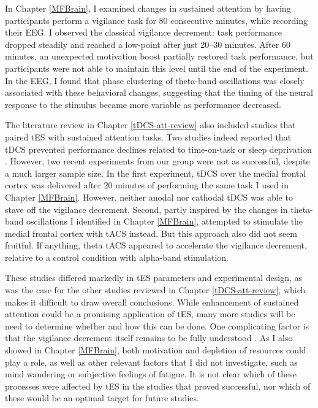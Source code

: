 \documentclass[11pt,]{memoir}
\begin{document}
In Chapter \ref{MFBrain}, I examined changes in sustained attention by having participants perform a vigilance task for 80 consecutive minutes, while recording their EEG. I observed the classical vigilance decrement: task performance dropped steadily and reached a low-point after just 20--30 minutes. After 60 minutes, an unexpected motivation boost partially restored task performance, but participants were not able to maintain this level until the end of the experiment. In the EEG, I found that phase clustering of theta-band oscillations was closely associated with these behavioral changes, suggesting that the timing of the neural response to the stimulus became more variable as performance decreased.

The literature review in Chapter \ref{tDCS-att-review} also included studies that paired tES with sustained attention tasks. Two studies indeed reported that tDCS prevented performance declines related to time-on-task \autocite{Nelson2014} or sleep deprivation \autocite{McIntire2014}. However, two recent experiments from our group \autocite{VanSchouwenburg2019} were not as successful, despite a much larger sample size. In the first experiment, tDCS over the medial frontal cortex was delivered after 20 minutes of performing the same task I used in Chapter \ref{MFBrain}. However, neither anodal nor cathodal tDCS was able to stave off the vigilance decrement. Second, partly inspired by the changes in theta-band oscillations I identified in Chapter \ref{MFBrain}, \textcite{VanSchouwenburg2019} attempted to stimulate the medial frontal cortex with tACS instead. But this approach also did not seem fruitful. If anything, theta tACS appeared to accelerate the vigilance decrement, relative to a control condition with alpha-band stimulation.

These studies differed markedly in tES parameters and experimental design, as was the case for the other studies reviewed in Chapter \ref{tDCS-att-review}, which makes it difficult to draw overall conclusions. While enhancement of sustained attention could be a promising application of tES, many more studies will be need to determine whether and how this can be done. One complicating factor is that the vigilance decrement itself remains to be fully understood \autocites{Fortenbaugh2017}{Hancock2013}{Johnston2018}. As I also showed in Chapter \ref{MFBrain}, both motivation and depletion of resources could play a role, as well as other relevant factors that I did not investigate, such as mind wandering or subjective feelings of fatigue. It is not clear which of these processes were affected by tES in the studies that proved successful, nor which of these would be an optimal target for future studies.
\end{document}
